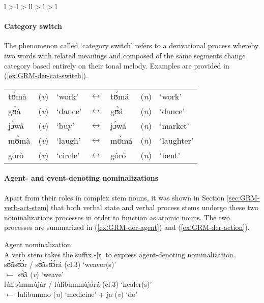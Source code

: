 \begin{exe}
\begin{exe}
\begin{exe}
\begin{exe}
\begin{exe}
\begin{exe}
\begin{table}
\begin{Itabular}{l > {\slshape}l  > {\slshape}ll > {\slshape}l > {\slshape}l}
 \end{Itabular}
\end{table} 
 

\paragraph{Category switch}
\label{sec:GRM-der-cat-switch}

The phenomenon called `category switch' refers to a derivational process whereby two words with  related meanings and composed of the same segments change category based entirely on their tonal melody. Examples are provided in (\ref{exːGRM-der-cat-switch}).

 \ea\label{exːGRM-der-cat-switch}
 \begin{tabular}[t]{lllllll}
tʊ̀mà & ({\it v})   & {\rm `work'}  &  $\leftrightarrow$ &  tʊ́má  & ({\it n})  &  {\rm `work'}\\
gʊ̀à  & ({\it v})  &   {\rm `dance'}  & $\leftrightarrow$ &  gʊ̀á  & ({\it n})  &  {\rm `dance'}\\
jɔ̀wà &  ({\it v})  &{\rm `buy'}  & $\leftrightarrow$& jɔ̀wá&  ({\it n})   &{\rm `market'}\\
mʊ̀mà & ({\it v}) & {\rm `laugh'}&  $\leftrightarrow$ &mʊ̀má &({\it n}) &{\rm  `laughter'} \\
gòrò &({\it v}) & {\rm `circle'} & $\leftrightarrow$& góró &({\it n}) & {\rm `bent'}  
 \end{tabular}
\z


\paragraph{Agent- and event-denoting nominalizations}
\label{sec:GRM-der-agent}

Apart from their roles in complex stem nouns, it was shown in Section \ref{sec:GRM-verb-act-stem} that both verbal state and verbal process stems undergo these two nominalizations processes in order to function as atomic nouns.
The two processes are summarized in (\ref{exːGRM-der-agent}) and 
(\ref{exːGRM-der-action}). 

\ea\label{exːGRM-der-agent}{\rm Agent nominalization}\\

\ea\label{exːGRM-der-agent-suffix}
{\rm A verb stem takes the suffix -[r]  to express agent-denoting
nominalization.}\\
{\sls  sʊ̃̀ã̀sʊ́ɔ́r} / {\sls sʊ̃̀ã̀sʊ́ɔ́rá} {\rm ({\sc cl.3}) `weaver(s)'}\\
  $\leftarrow$  {\sls sʊ̃̀ã̀} ({\it v}) {\rm  `weave'}\\
{\sls  lúlíbùmmùjár} / {\sls lúlíbùmmùjárá}  {\rm ({\sc cl.3})  `healer(s)' }
\\
 $\leftarrow$ {\sls lulibummo} ({\it n}) {\rm `medicine'} + {\sls ja} ({\it v})  {\rm `do'}



\end{exe}
\end{exe}
\end{exe}
\end{exe}
\end{exe}
\end{exe}

